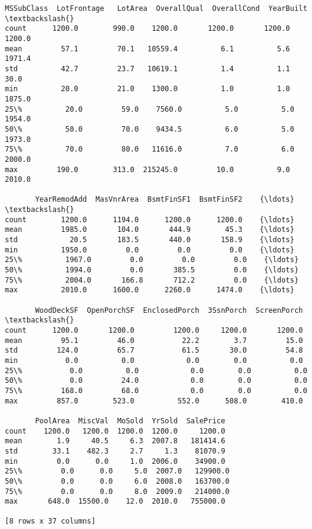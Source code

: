 \documentclass[11pt]{article}
\begin{document}
    \begin{Verbatim}[commandchars=\\\{\}]
       MSSubClass  LotFrontage   LotArea  OverallQual  OverallCond  YearBuilt  \textbackslash{}
count      1200.0        990.0    1200.0       1200.0       1200.0     1200.0   
mean         57.1         70.1   10559.4          6.1          5.6     1971.4   
std          42.7         23.7   10619.1          1.4          1.1       30.0   
min          20.0         21.0    1300.0          1.0          1.0     1875.0   
25\%          20.0         59.0    7560.0          5.0          5.0     1954.0   
50\%          50.0         70.0    9434.5          6.0          5.0     1973.0   
75\%          70.0         80.0   11616.0          7.0          6.0     2000.0   
max         190.0        313.0  215245.0         10.0          9.0     2010.0   

       YearRemodAdd  MasVnrArea  BsmtFinSF1  BsmtFinSF2    {\ldots}      \textbackslash{}
count        1200.0      1194.0      1200.0      1200.0    {\ldots}       
mean         1985.0       104.0       444.9        45.3    {\ldots}       
std            20.5       183.5       440.0       158.9    {\ldots}       
min          1950.0         0.0         0.0         0.0    {\ldots}       
25\%          1967.0         0.0         0.0         0.0    {\ldots}       
50\%          1994.0         0.0       385.5         0.0    {\ldots}       
75\%          2004.0       166.8       712.2         0.0    {\ldots}       
max          2010.0      1600.0      2260.0      1474.0    {\ldots}       

       WoodDeckSF  OpenPorchSF  EnclosedPorch  3SsnPorch  ScreenPorch  \textbackslash{}
count      1200.0       1200.0         1200.0     1200.0       1200.0   
mean         95.1         46.0           22.2        3.7         15.0   
std         124.0         65.7           61.5       30.0         54.8   
min           0.0          0.0            0.0        0.0          0.0   
25\%           0.0          0.0            0.0        0.0          0.0   
50\%           0.0         24.0            0.0        0.0          0.0   
75\%         168.0         68.0            0.0        0.0          0.0   
max         857.0        523.0          552.0      508.0        410.0   

       PoolArea  MiscVal  MoSold  YrSold  SalePrice  
count    1200.0   1200.0  1200.0  1200.0     1200.0  
mean        1.9     40.5     6.3  2007.8   181414.6  
std        33.1    482.3     2.7     1.3    81070.9  
min         0.0      0.0     1.0  2006.0    34900.0  
25\%         0.0      0.0     5.0  2007.0   129900.0  
50\%         0.0      0.0     6.0  2008.0   163700.0  
75\%         0.0      0.0     8.0  2009.0   214000.0  
max       648.0  15500.0    12.0  2010.0   755000.0  

[8 rows x 37 columns]

    \end{Verbatim}
\end{document}
